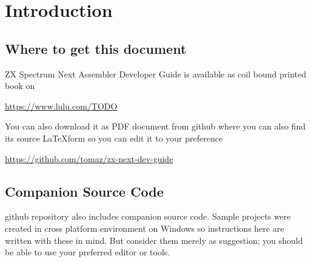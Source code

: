 \documentclass[12pt,twoside,openright,a4paper]{book}
\begin{document}
\chapter{Introduction}

\minitoc


\section{Where to get this document}

ZX Spectrum Next Assembler Developer Guide is available as coil bound printed book on

\url{https://www.lulu.com/TODO}

You can also download it as PDF document from github where you can also find its source \LaTeX form so you can edit it to your preference

\url{https://github.com/tomaz/zx-next-dev-guide}


\section{Companion Source Code}

github repository also includes companion source code. Sample projects were created in cross platform environment on Windows so instructions here are written with these in mind. But consider them merely as suggestion; you should be able to use your preferred editor or tools.
\end{document}
